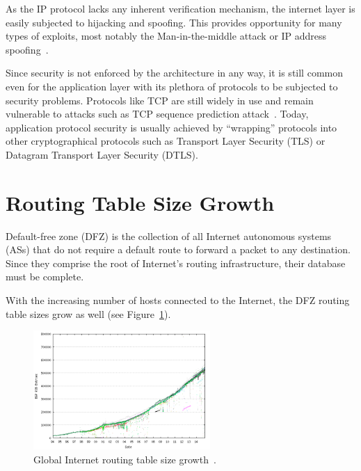         As the IP protocol lacks any inherent verification mechanism, the internet layer is easily subjected to hijacking and spoofing. This provides opportunity for many types of exploits, most notably the Man-in-the-middle attack or IP address spoofing~\cite{rfc1948}.

        Since security is not enforced by the architecture in any way, it is still common even for the application layer with its plethora of protocols to be subjected to security problems. Protocols like TCP are still widely in use and remain vulnerable to attacks such as TCP sequence prediction attack~\cite{rfc1948}. Today, application protocol security is usually achieved by ``wrapping'' protocols into other cryptographical protocols such as Transport Layer Security (TLS) or Datagram Transport Layer Security (DTLS).

    \section{Routing Table Size Growth}

        Default-free zone (DFZ) is the collection of all Internet autonomous systems (ASs) that do not require a default route to forward a packet to any destination. Since they comprise the root of Internet's routing infrastructure, their database must be complete.

        With the increasing number of hosts connected to the Internet, the DFZ routing table sizes grow as well (see Figure~\ref{fig:bgp-growth}).

        \begin{figure}[H]
            \begin{center}
                \includegraphics[width=0.6\textwidth]{fig/problems_bgp-growth.png}
              \caption{Global Internet routing table size growth~\cite{bgpgrow}.}
              \label{fig:bgp-growth}
            \end{center}
        \end{figure}

